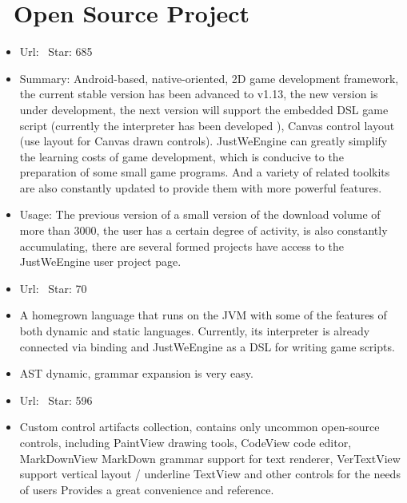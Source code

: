\documentclass{resume}
\begin{document}
\section{\faGithubSquare\ Open Source Project}
\begin{itemize}
  \item Url:{} {\textperiodcentered\ Star: 685}
  \item Summary: Android-based, native-oriented, 2D game development framework, the current stable version has been advanced to v1.13, the new version is under development, the next version will support the embedded DSL game script (currently the interpreter has been developed ), Canvas control layout (use layout for Canvas drawn controls). JustWeEngine can greatly simplify the learning costs of game development, which is conducive to the preparation of some small game programs. And a variety of related toolkits are also constantly updated to provide them with more powerful features.
  \item Usage: The previous version of a small version of the download volume of more than 3000, the user has a certain degree of activity, is also constantly accumulating, there are several formed projects have access to the JustWeEngine user project page.
\end{itemize}

\begin{itemize}
  \item Url:{} {\textperiodcentered\ Star: 70}
  \item A homegrown language that runs on the JVM with some of the features of both dynamic and static languages. Currently, its interpreter is already connected via binding and JustWeEngine as a DSL for writing game scripts.
  \item AST dynamic, grammar expansion is very easy.
\end{itemize}

\begin{itemize}
  \item Url:{} {\textperiodcentered\ Star: 596}
  \item Custom control artifacts collection, contains only uncommon open-source controls, including PaintView drawing tools, CodeView code editor, MarkDownView MarkDown grammar support for text renderer, VerTextView support vertical layout / underline TextView and other controls for the needs of users Provides a great convenience and reference.
\end{itemize}
\end{document}
